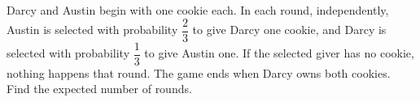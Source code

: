 Darcy and Austin begin with one cookie each. In each round, independently, Austin is selected with probability $\dfrac{2}{3}$ to give Darcy one cookie, and Darcy is selected with probability $\dfrac{1}{3}$ to give Austin one. If the selected giver has no cookie, nothing happens that round. The game ends when Darcy owns both cookies. Find the expected number of rounds.
